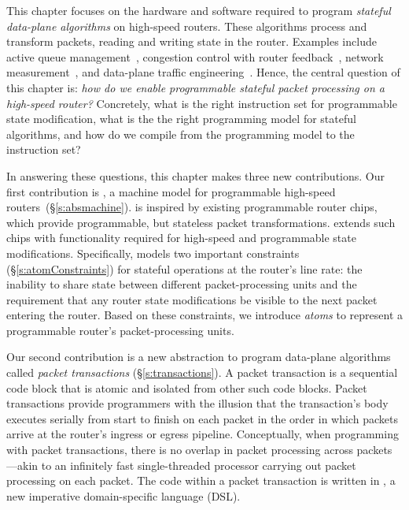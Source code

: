 This chapter focuses on the hardware and software required to program {\em
stateful data-plane algorithms} on high-speed routers. These algorithms process
and transform packets, reading and writing state in the router. Examples
include active queue management~\cite{red,avq,codel}, congestion control with
router feedback~\cite{xcp, rcp}, network measurement~\cite{opensketch,
bitmap_george}, and data-plane traffic engineering~\cite{conga, flowlets}.
Hence, the central question of this chapter is: {\em how do we enable
programmable stateful packet processing on a high-speed router?} Concretely,
what is the right instruction set for programmable state modification, what is
the the right programming model for stateful algorithms, and how do we compile
from the programming model to the instruction set?

In answering these questions, this chapter makes three new contributions.  Our
first contribution is {\em \absmachine}, a machine model for programmable
high-speed routers~(\S\ref{s:absmachine}).  \absmachine is inspired by existing
programmable router chips, which provide programmable, but stateless packet
transformations. \absmachine extends such chips with functionality required for
high-speed and programmable state modifications.  Specifically, \absmachine
models two important constraints (\S\ref{s:atomConstraints}) for stateful
operations at the router's line rate: the inability to share state between
different packet-processing units and the requirement that any router state
modifications be visible to the next packet entering the router. Based on these
constraints, we introduce {\em atoms} to represent a programmable router's
packet-processing units.

Our second contribution is a new abstraction to program data-plane algorithms
called {\em packet transactions} (\S\ref{s:transactions}). A packet transaction
is a sequential code block that is atomic and isolated from other such code
blocks.  Packet transactions provide programmers with the illusion that the
transaction's body executes serially from start to finish on each packet in the
order in which packets arrive at the router's ingress or egress pipeline.
Conceptually, when programming with packet transactions, there is no overlap in
packet processing across packets---akin to an infinitely fast single-threaded
processor carrying out packet processing on each packet. The code within a
packet transaction is written in {\em \pktlanguage{}}, a new imperative
domain-specific language (DSL).

